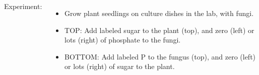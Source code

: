 \begin{noheadline}
\begin{frame}[t]
    \begin{adjustwidth}{-2em}{-1.5em}
        \vspace{-7mm}
        \begin{columns}[t]


            Experiment:

            \begin{itemize}[<+->]
                \item Grow plant seedlings on culture dishes in the
                    lab, with fungi.

                \item TOP: Add labeled sugar to the plant (top), and zero
                    (left) or lots (right) of phosphate to the fungi.

                \item BOTTOM: Add labeled P to the fungus (top), and zero
                    (left) or lots (right) of sugar to the plant.
            \end{itemize}



\end{columns}
\end{adjustwidth}
\end{frame}
\end{noheadline}
